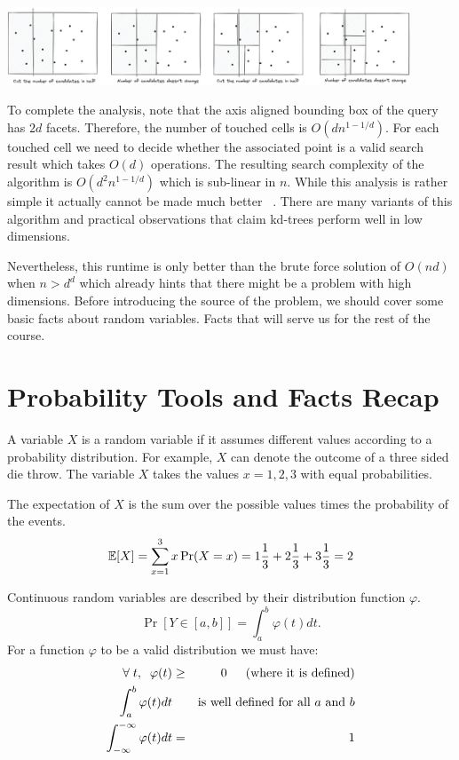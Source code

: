 \documentclass{article}
\begin{document}
\begin{center}
\includegraphics[width=0.9\textwidth]{images/kdtrees-proof.png}
\end{center}

To complete the analysis, note that the axis aligned bounding box of the query has $2d$ facets. Therefore, the number of touched cells is $O(dn^{1-1/d})$.
For each touched cell we need to decide whether the associated point is a valid search result which takes $O(d)$ operations. 
The resulting search complexity of the algorithm is $O(d^2n^{1-1/d})$ which is sub-linear in $n$.
While this analysis is rather simple it actually cannot be made much better  \cite{kdtree-worstcase}. There are many variants of this algorithm \cite{rptrees} and practical observations that claim kd-trees perform well in low dimensions. 

Nevertheless, this runtime is only better than the brute force solution of $O(nd)$ when $n > d^d$ which already hints that there might be a problem with high dimensions.
Before introducing the source of the problem, we should cover some basic facts about random variables. Facts that will serve us for the rest of the course.


\section{Probability Tools and Facts Recap}

A variable $X$ is a random variable if it assumes different values
according to a probability distribution. For example, $X$ can 
denote the outcome of a three sided die throw. 
The variable $X$ takes the values $x = 1,2,3$ with equal probabilities. 

The expectation of $X$ is the sum over the possible values times the probability of the events.
\begin{equation}
{\mathbb E}[X] = \sum_{x=1}^{3}x \Pr(X = x)=
1\frac{1}{3}+2\frac{1}{3}+3\frac{1}{3} = 2
\end{equation}


Continuous random variables are described by their distribution function $\varphi$.
$$
\Pr[Y \in [a,b]] = \int_{a}^{b}\varphi (t) dt.
$$
For a function $\varphi$ to be a valid distribution we must have:
\begin{eqnarray}
\forall \;t, \;\; \varphi(t) &\ge& 0  \mbox{\;\;\; (where it is defined)}\\
\int_{a}^{b}\varphi (t) dt && \mbox{is well defined for all $a$ and $b$}\\
\int_{-\infty}^{-\infty}\varphi (t) dt &=& 1
\end{eqnarray}
\end{document}
